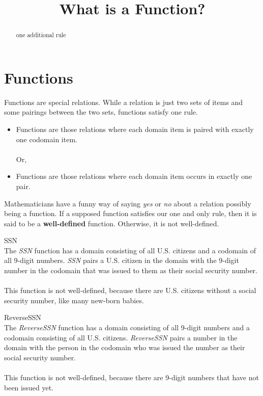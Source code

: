 \documentclass{ximera}
\title{What is a Function?}
\begin{document}
\begin{abstract}
one additional rule
\end{abstract}
\maketitle




\section{Functions}

Functions are special relations. While a relation is just two sets of items and some pairings between the two sets, functions satisfy one rule. 

\begin{itemize}
\item Functions are those relations where each domain item is paired with exactly one codomain item. \\  \\ Or, 
\item Functions are those relations where each domain item occurs in exactly one pair.
\end{itemize}


Mathematicians have a funny way of saying \textit{yes} or \textit{no} about a relation possibly being a function. If a supposed function satisfies our one and only rule, then it is said to be a \textbf{well-defined} function.  Otherwise, it is not well-defined.


\begin{example} SSN \\
The \textit{SSN} function has a domain consisting of all U.S. citizens and a codomain of all 9-digit numbers.  \textit{SSN} pairs a U.S. citizen in the domain with the 9-digit number in the codomain that was issued to them as their social security number. 
\\ \\ 
This function is not well-defined, because there are U.S. citizens without a social security number, like many new-born babies.
\end{example}


\begin{example} ReverseSSN \\
The \textit{ReverseSSN} function has a domain consisting of all 9-digit numbers and a codomain consisting of all U.S. citizens.  \textit{ReverseSSN} pairs a number in the domain with the person in the codomain who was issued the number as their social security number. 
\\ \\ 
This function is not well-defined, because there are 9-digit numbers that have not been issued yet.
\end{example}
\end{document}
